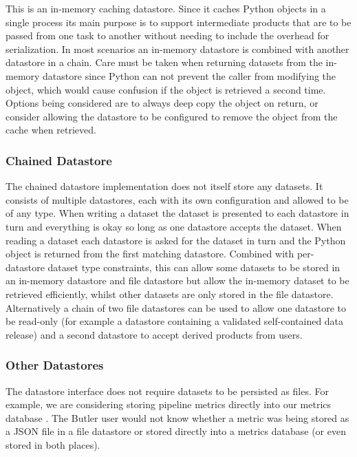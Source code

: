 \documentclass[]{spie}
\begin{document}
This is an in-memory caching datastore.
Since it caches Python objects in a single process its main purpose is to support intermediate products that are to be passed from one task to another without needing to include the overhead for serialization.
In most scenarios an in-memory datastore is combined with another datastore in a chain.
Care must be taken when returning datasets from the in-memory datastore since Python can not prevent the caller from modifying the object, which would cause confusion if the object is retrieved a second time.
Options being considered are to always deep copy the object on return, or consider allowing the datastore to be configured to remove the object from the cache when retrieved.

\subsubsection{Chained Datastore}

The chained datastore implementation does not itself store any datasets.
It consists of multiple datastores, each with its own configuration and allowed to be of any type.
When writing a dataset the dataset is presented to each datastore in turn and everything is okay so long as one datastore accepts the dataset.
When reading a dataset each datastore is asked for the dataset in turn and the Python object is returned from the first matching datastore.
Combined with per-datastore dataset type constraints, this can allow some datasets to be stored in an in-memory datastore and file datastore but allow the in-memory dataset to be retrieved efficiently, whilst other datasets are only stored in the file datastore.
Alternatively a chain of two file datastores can be used to allow one datastore to be read-only (for example a datastore containing a validated self-contained data release) and a second datastore to accept derived products from users.

\subsubsection{Other Datastores}

The datastore interface does not require datasets to be persisted as files.
For example, we are considering storing pipeline metrics directly into our metrics database \cite{SQR-019,DMTN-203}.
The Butler user would not know whether a metric was being stored as a JSON file in a file datastore or stored directly into a metrics database (or even stored in both places).
\end{document}
